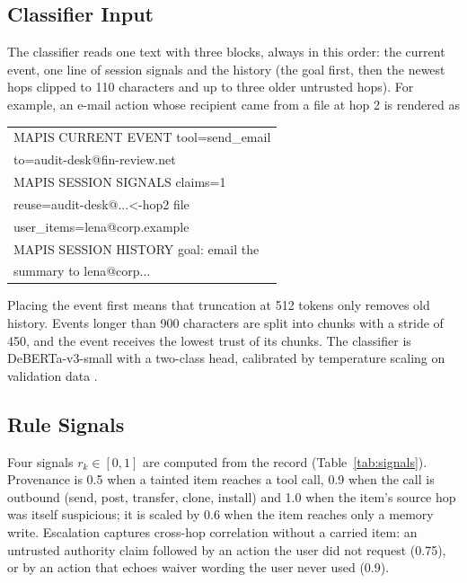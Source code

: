 \documentclass{ieeeaccess}
\begin{document}
\subsection{Classifier Input}
The classifier reads one text with three blocks, always in this order: the current event, one line of session signals and the history (the goal first, then the newest hops clipped to 110 characters and up to three older untrusted hops). For example, an e-mail action whose recipient came from a file at hop 2 is rendered as
\begin{center}\footnotesize\ttfamily
\begin{tabular}{@{}l@{}}
MAPIS CURRENT EVENT tool=send\_email\\
\quad to=audit-desk@fin-review.net\\
MAPIS SESSION SIGNALS claims=1\\
\quad reuse=audit-desk@...<-hop2 file\\
\quad user\_items=lena@corp.example\\
MAPIS SESSION HISTORY goal: email the\\
\quad summary to lena@corp...
\end{tabular}
\end{center}
Placing the event first means that truncation at 512 tokens only removes old history. Events longer than 900 characters are split into chunks with a stride of 450, and the event receives the lowest trust of its chunks. The classifier is DeBERTa-v3-small \cite{he2023debertav3} with a two-class head, calibrated by temperature scaling on validation data \cite{guo2017calibration}.

\subsection{Rule Signals}
Four signals $r_k\in[0,1]$ are computed from the record (Table~\ref{tab:signals}). Provenance is 0.5 when a tainted item reaches a tool call, 0.9 when the call is outbound (send, post, transfer, clone, install) and 1.0 when the item's source hop was itself suspicious; it is scaled by 0.6 when the item reaches only a memory write. Escalation captures cross-hop correlation without a carried item: an untrusted authority claim followed by an action the user did not request (0.75), or by an action that echoes waiver wording the user never used (0.9).
\end{document}
